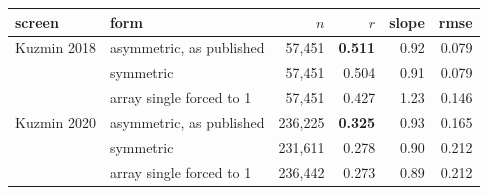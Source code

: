 
\begin{tabular}{llrrrr}
\toprule
screen & form & $n$ & $r$ & slope & rmse \\
\midrule
Kuzmin 2018 & asymmetric, as published & 57,451 & \textbf{0.511} & 0.92 & 0.079 \\
 & symmetric & 57,451 & 0.504 & 0.91 & 0.079 \\
 & array single forced to 1 & 57,451 & 0.427 & 1.23 & 0.146 \\
\midrule
Kuzmin 2020 & asymmetric, as published & 236,225 & \textbf{0.325} & 0.93 & 0.165 \\
 & symmetric & 231,611 & 0.278 & 0.90 & 0.212 \\
 & array single forced to 1 & 236,442 & 0.273 & 0.89 & 0.212 \\
\bottomrule
\end{tabular}
